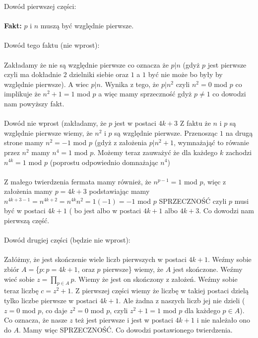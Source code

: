 Dowód pierwszej części: \\ \\
\textbf{Fakt:} $p$ i $n$ muszą być względnie pierwsze.
\\
\\ Dowód tego faktu (nie wprost):\\ \\
Zakładamy że nie są względnie pierwsze co oznacza że $p | n$ (gdyż $p$ jest pierwsze czyli ma dokładnie $2$ dzielniki siebie oraz $1$ a $1$ być nie może bo były by względnie pierwsze). A wiec $p | n$. Wynika z tego, że $p | n^{2}$ czyli $n^{2} = 0$ mod $p$ co implikuje że $n^{2} + 1 = 1$ mod $p$ a więc mamy sprzeczność gdyż $p \neq 1$ co dowodzi nam powyższy fakt.
\\
\\
Dowód nie wprost (zakładamy, że $p$ jest w postaci $4k + 3$
Z faktu że $n$ i $p$ są względnie pierwsze wiemy, że $n^{2}$ i $p$ są względnie pierwsze. Przenosząc $1$ na drugą strone mamy $n^{2} = -1$ mod $p$ (gdyż z założenia $p | n^{2} + 1$, wymnażająć to rówanie przez $n^{2}$ mamy $n^{4} = 1$ mod $p$. Możemy teraz zauważyć że dla każdego $k$ zachodzi $n^{4k} = 1$ mod $p$ (poprostu odpowiednio domnażając $n^{4}$)\\ \\
Z małego twierdzenia fermata mamy również, że $n^{p-1} = 1$ mod $p$, więc z założenia mamy $p = 4k+3$ podstawiając mamy $n^{4k+3-1} = n^{4k+2} = n^{4k}n^{2} = 1(-1) = -1$ mod $p$ SPRZECZNOŚĆ czyli $p$ musi być w postaci $4k + 1$ ( bo jest albo w postaci $4k + 1$ albo $4k + 3$. Co dowodzi nam pierwszą część.
\\
\\
Dowód drugiej części (będzie nie wprost):
\\
\\
Załóżmy, że jest skończenie wiele liczb pierwszych w postaci $4k + 1$. Weźmy sobie zbiór $A = $\{$ p: p = 4k +1$, oraz $p$ pierwsze\} wiemy, że $A$ jest skończone. Weźmy wieć sobie $z = \prod_{p \in A} p$. Wiemy że jest on skończony z założeń. Weźmy sobie teraz liczbę $c = z^{2} + 1$. Z pierwszej części wiemy że liczbę w takiej postaci dzielą tylko liczbe pierwsze w postaci $4k+1$.
 Ale żadna z naszych liczb jej nie dzieli ($z = 0$ mod $p$, co daje $z^{2} = 0$ mod $p$, czyli $z^{2} + 1 = 1$ mod $p$ dla każdego $p \in A$). Co oznacza, że nasze $z$ też jest pierwsze i jest w postaci $4k + 1$ i nie należało ono do $A$. Mamy więc SPRZECZNOŚĆ. Co dowodzi postawionego twierdzenia.



